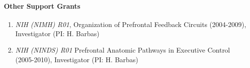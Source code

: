 \paragraph{Other Support Grants}
\begin{enumerate}
\item {\sl NIH (NIMH) R01}, Organization of Prefrontal Feedback Circuits
(2004-2009), Investigator (PI: H. Barbas)
\item {\sl NIH (NINDS) R01} Prefrontal Anatomic Pathways in Executive Control
 (2005-2010), Investigator (PI: H. Barbas)
 \end{enumerate}


\nocite{Hilgetag1,Hilgetag2,Hilgetag3,Hilgetag4,Hilgetag5,Hilgetag6, Hilgetag7,Hilgetag8,hilgetag9,hilgetag10}
